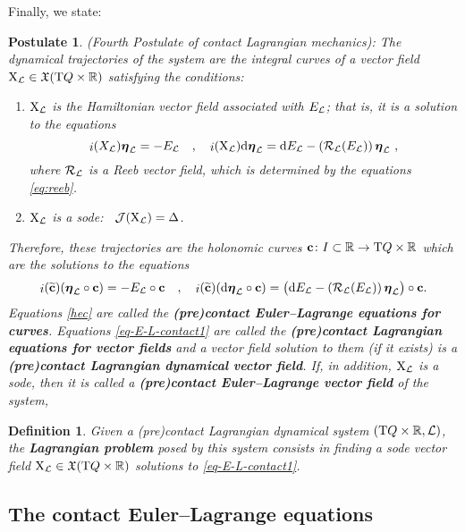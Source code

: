 \documentclass[12pt]{report}
\newtheorem{definition}[teor]{Definition}
\newtheorem{pos}[teor]{Postulate}
\def\beq{\begin{equation}}
\def\eeq{\end{equation}}
\def\ben{\begin{enumerate}}
\def\een{\end{enumerate}}
\def\vf{\mathfrak X}
\def\Lag{{\cal L}}
\def\d{{\rm d}}
\def\Real{\mathbb{R}}
\def\bmeta{\mbox{\boldmath $\eta$}}
\def\X{{\rm X}}
\def\Tan{{\rm T}}
\def\inn{\mathop{i}\nolimits}
\newcommand{\Reeb}{\mathcal{R}}
\begin{document}
Finally, we state:

\begin{pos}
{\rm (Fourth Postulate of contact Lagrangian mechanics\/)}:
The dynamical trajectories of the system are the integral curves
of a vector field $\X_\Lag\in \vf(\Tan Q\times\Real)$ satisfying the conditions:
\ben
\item
$\X_\Lag$ is the Hamiltonian vector field associated with $E_\Lag$;
that is, it is a solution to the equations
\beq
\label{eq-E-L-contact1}
\inn(X_\Lag)\bmeta_\Lag=-E_\Lag \quad,\quad
\inn(\X_\Lag)\d \bmeta_\Lag=\d E_\Lag-(\Reeb_\Lag(E_\Lag))\,\bmeta_\Lag \ ,
\eeq
where $\Reeb_\Lag$ is a Reeb vector field, which is determined by the equations \eqref{eq:reeb}.
\item
$\X_\Lag$ is a {\sc sode}:
\ ${\cal J}(\X_\Lag)=\Delta$.
\een
Therefore, these trajectories are the holonomic curves 
${\bf c}\colon I\subset\Real\to\Tan Q\times\Real$
which are the solutions to the equations
\beq
\inn({\bf\widetilde c})(\bmeta_\Lag\circ {\bf c}) = - E_\Lag\circ{\bf c} \quad  , \quad
\inn({\bf\widetilde c})(\d\bmeta_\Lag\circ {\bf  c})=\big(\d E_\Lag - (\Reeb_\Lag(E_\Lag))\,\bmeta_\Lag\big)\circ{\bf c} .
\label{hec}
\eeq
Equations \eqref{hec} are called the
{\sl \textbf{(pre)contact Euler--Lagrange equations for curves}}.
Equations \eqref{eq-E-L-contact1} are called the
{\sl \textbf{(pre)contact Lagrangian equations for vector fields}} and
a vector field solution to them (if it exists) is a
{\sl \textbf{(pre)contact Lagrangian dynamical vector field}}.
If, in addition, $\X_\Lag$ is a {\sc sode}, then
it is called a {\sl \textbf{(pre)contact Euler--Lagrange vector field}} of the system, 
\end{pos}

\begin{definition}
Given a (pre)contact Lagrangian dynamical system $(\Tan Q\times\Real,\Lag)$, 
the {\sl \textbf{Lagrangian problem}} posed by this system
consists in finding a {\sc sode} vector field $\X_\Lag\in\vf(\Tan Q\times\Real)$
solutions to \eqref{eq-E-L-contact1}.
\end{definition}


\subsection{The contact Euler--Lagrange equations}
\end{document}
